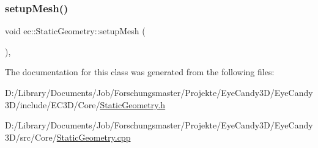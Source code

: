 \subsubsection{\texorpdfstring{setup\+Mesh()}{setupMesh()}}
{\footnotesize\ttfamily void ec\+::\+Static\+Geometry\+::setup\+Mesh (\begin{DoxyParamCaption}{ }\end{DoxyParamCaption})\hspace{0.3cm}{\ttfamily [protected]}, {\ttfamily [virtual]}}



The documentation for this class was generated from the following files\+:\begin{DoxyCompactItemize}
\item 
D\+:/\+Library/\+Documents/\+Job/\+Forschungsmaster/\+Projekte/\+Eye\+Candy3\+D/\+Eye\+Candy3\+D/include/\+E\+C3\+D/\+Core/\mbox{\hyperlink{_static_geometry_8h}{Static\+Geometry.\+h}}\item 
D\+:/\+Library/\+Documents/\+Job/\+Forschungsmaster/\+Projekte/\+Eye\+Candy3\+D/\+Eye\+Candy3\+D/src/\+Core/\mbox{\hyperlink{_static_geometry_8cpp}{Static\+Geometry.\+cpp}}\end{DoxyCompactItemize}
